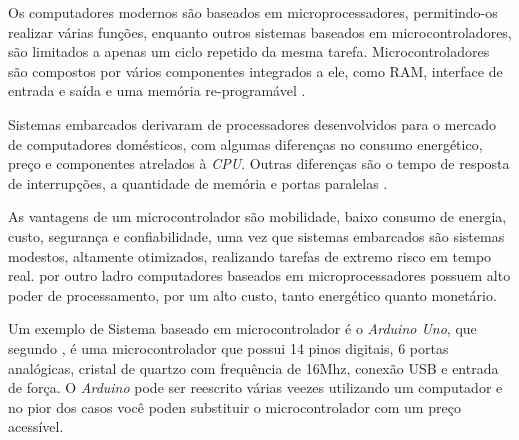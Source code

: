Os computadores modernos são baseados em microprocessadores, permitindo-os realizar várias funções, enquanto outros sistemas baseados em microcontroladores, são limitados a apenas um ciclo repetido da mesma tarefa\cite{heath:2002}. Microcontroladores são compostos por vários componentes integrados a ele, como RAM, interface de entrada e saída e uma memória re-programável \cite{white:2011}.


Sistemas embarcados derivaram de processadores desenvolvidos para o mercado de computadores domésticos, com algumas diferenças no consumo energético, preço e componentes atrelados à \textit{CPU}. Outras diferenças são o tempo de resposta de interrupções, a quantidade de memória e portas paralelas \cite{schlett:1998}.

As vantagens de um microcontrolador são mobilidade, baixo consumo de energia, custo, segurança e confiabilidade, uma vez que sistemas embarcados são sistemas modestos, altamente otimizados, realizando tarefas de extremo risco em tempo real. por outro ladro computadores baseados em microprocessadores possuem alto poder de processamento, por um alto custo, tanto energético quanto monetário. %

Um exemplo de Sistema baseado em microcontrolador é o \textit{Arduino Uno}, que segundo , é uma microcontrolador que possui 14 pinos digitais, 6 portas analógicas, cristal de quartzo com frequência de 16Mhz, conexão USB e entrada de força. O \textit{Arduino} pode ser reescrito várias veezes utilizando um computador e no pior dos casos você poden substituir o microcontrolador com um preço acessível.

